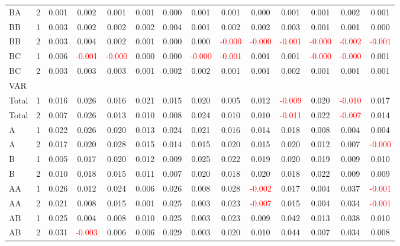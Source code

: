 \begin{table}[!htb]
{\begin{tabular}{llcccccccccccc}
BA & 2 & 0.001 & 0.002 & 0.001 & 0.001 & 0.000 & 0.001 & 0.001 & 0.000 & 0.001 & 0.001 & 0.002 & 0.001\\
BB & 1 & 0.003 & 0.002 & 0.002 & 0.002 & 0.004 & 0.001 & 0.002 & 0.002 & 0.003 & 0.001 & 0.001 & 0.000\\
BB & 2 & 0.003 & 0.004 & 0.002 & 0.001 & 0.000 & 0.000 & \textcolor{red}{-0.000} & \textcolor{red}{-0.000} & \textcolor{red}{-0.001} & \textcolor{red}{-0.000} & \textcolor{red}{-0.002} & \textcolor{red}{-0.001}\\
BC & 1 & 0.006 & \textcolor{red}{-0.001} & \textcolor{red}{-0.000} & 0.000 & 0.000 & \textcolor{red}{-0.000} & \textcolor{red}{-0.001} & 0.001 & 0.001 & \textcolor{red}{-0.000} & \textcolor{red}{-0.000} & 0.001\\
BC & 2 & 0.003 & 0.003 & 0.003 & 0.001 & 0.002 & 0.002 & 0.001 & 0.001 & 0.002 & 0.001 & 0.001 & 0.001\\
\hline
VAR &  &  &  &  &  &  &  &  &  &  &  &  & \\
\hline
Total & 1 & 0.016 & 0.026 & 0.016 & 0.021 & 0.015 & 0.020 & 0.005 & 0.012 & \textcolor{red}{-0.009} & 0.020 & \textcolor{red}{-0.010} & 0.017\\
Total & 2 & 0.007 & 0.026 & 0.013 & 0.010 & 0.008 & 0.024 & 0.010 & 0.010 & \textcolor{red}{-0.011} & 0.022 & \textcolor{red}{-0.007} & 0.014\\
A & 1 & 0.022 & 0.026 & 0.020 & 0.013 & 0.024 & 0.021 & 0.016 & 0.014 & 0.018 & 0.008 & 0.004 & 0.004\\
A & 2 & 0.017 & 0.020 & 0.028 & 0.015 & 0.014 & 0.015 & 0.020 & 0.015 & 0.020 & 0.012 & 0.007 & \textcolor{red}{-0.000}\\
B & 1 & 0.005 & 0.017 & 0.020 & 0.012 & 0.009 & 0.025 & 0.022 & 0.019 & 0.020 & 0.019 & 0.009 & 0.010\\
B & 2 & 0.010 & 0.018 & 0.015 & 0.011 & 0.007 & 0.020 & 0.018 & 0.020 & 0.018 & 0.022 & 0.009 & 0.009\\
AA & 1 & 0.026 & 0.012 & 0.024 & 0.006 & 0.026 & 0.008 & 0.028 & \textcolor{red}{-0.002} & 0.017 & 0.004 & 0.037 & \textcolor{red}{-0.001}\\
AA & 2 & 0.021 & 0.008 & 0.015 & 0.001 & 0.025 & 0.003 & 0.023 & \textcolor{red}{-0.007} & 0.015 & 0.004 & 0.034 & \textcolor{red}{-0.001}\\
AB & 1 & 0.025 & 0.004 & 0.008 & 0.010 & 0.025 & 0.003 & 0.023 & 0.009 & 0.042 & 0.013 & 0.038 & 0.010\\
AB & 2 & 0.031 & \textcolor{red}{-0.003} & 0.006 & 0.006 & 0.029 & 0.003 & 0.020 & 0.010 & 0.044 & 0.007 & 0.034 & 0.008\\

\end{tabular}}
\end{table}
